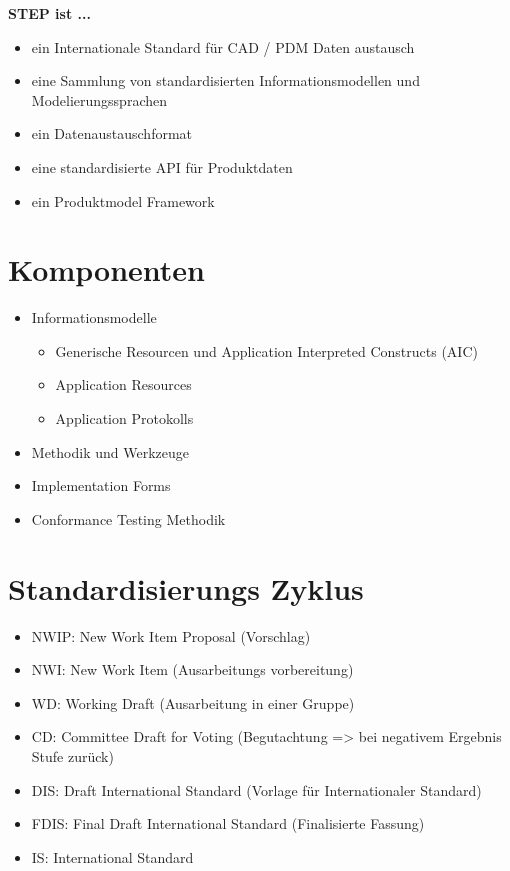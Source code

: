 \textbf{STEP ist ...}

\begin{itemize}
\item ein Internationale Standard für CAD / PDM Daten austausch
\item eine Sammlung von standardisierten Informationsmodellen und Modelierungssprachen
\item ein Datenaustauschformat
\item eine standardisierte API für Produktdaten
\item ein Produktmodel Framework
\end{itemize}

\section{Komponenten}

\begin{itemize}
\item {
Informationsmodelle
\begin{itemize}
\item Generische Resourcen und Application Interpreted Constructs (AIC)
\item Application Resources
\item Application Protokolls
\end{itemize}
}
\item Methodik und Werkzeuge
\item Implementation Forms
\item Conformance Testing Methodik
\end{itemize}

\section{Standardisierungs Zyklus}

\begin{itemize}
\item NWIP: New Work Item Proposal (Vorschlag)
\item NWI: New Work Item (Ausarbeitungs vorbereitung)
\item WD: Working Draft (Ausarbeitung in einer Gruppe)
\item CD: Committee Draft for Voting (Begutachtung => bei negativem Ergebnis Stufe zurück) 
\item DIS: Draft International Standard (Vorlage für Internationaler Standard)
\item FDIS: Final Draft International Standard (Finalisierte Fassung)
\item IS: International Standard
\end{itemize}

